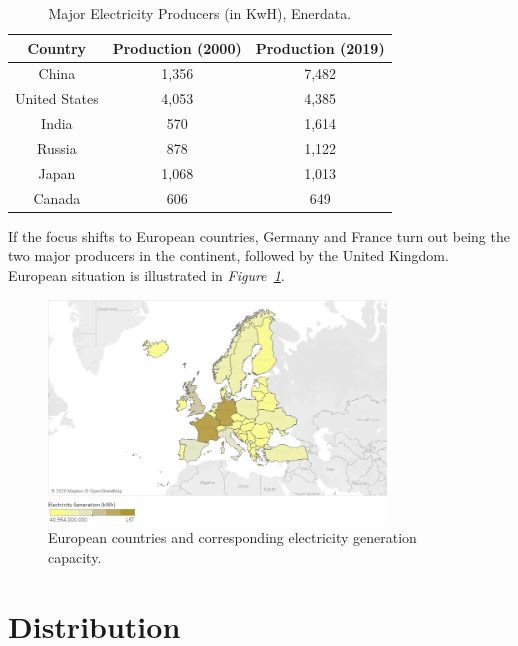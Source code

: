 \documentclass[a4paper,12pt]{book}
\begin{document}
\begin{table}[hbt]
\begin{center}
\begin{tabular}{|c|c|c|}
\hline
Country & Production (2000) & Production (2019)\\
\hline
China & 1,356 & 7,482\\
United States & 4,053 & 4,385\\
India & 570 & 1,614\\
Russia & 878 & 1,122\\
Japan & 1,068 & 1,013\\
Canada & 606 & 649\\
\hline
\end{tabular}
\caption{Major Electricity Producers (in KwH), Enerdata.}
\label{Tab:enerdata}
\end{center}
\end{table}

If the focus shifts to European countries, Germany and France turn out being the two major producers in the continent, followed by the United Kingdom. European situation is illustrated in \textit{Figure~\ref{fig:capacity}}.

\begin{figure}[tb]
\begin{center}
\captionsetup{justification=centering}
\includegraphics[width=0.8\textwidth]{Images/prod.png}
\caption{European countries and corresponding electricity generation capacity. }
\label{fig:capacity}
\end{center}
\end{figure}

\section{Distribution}
\end{document}
